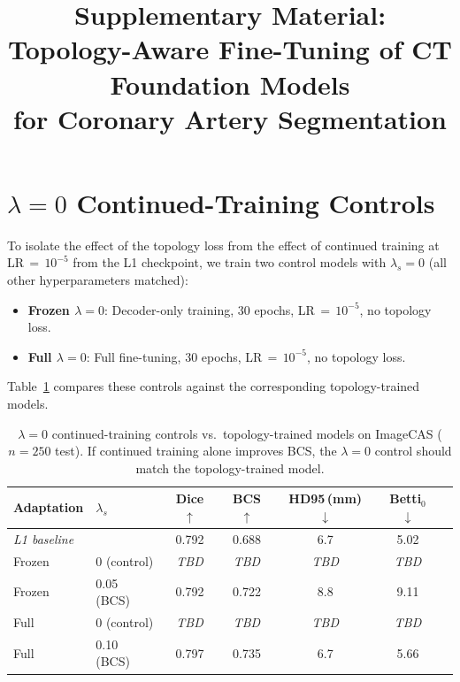 \documentclass[runningheads]{llncs}
\begin{document}
\title{Supplementary Material:\\Topology-Aware Fine-Tuning of CT Foundation Models\\for Coronary Artery Segmentation}
\maketitle


\section{$\lambda{=}0$ Continued-Training Controls}
\label{sec:lambda0}

To isolate the effect of the topology loss from the effect of continued training at LR$\,{=}\,10^{-5}$ from the L1 checkpoint, we train two control models with $\lambda_s{=}0$ (all other hyperparameters matched):

\begin{itemize}
\item \textbf{Frozen $\lambda{=}0$}: Decoder-only training, 30 epochs, LR$\,{=}\,10^{-5}$, no topology loss.
\item \textbf{Full $\lambda{=}0$}: Full fine-tuning, 30 epochs, LR$\,{=}\,10^{-5}$, no topology loss.
\end{itemize}

Table~\ref{tab:lambda0} compares these controls against the corresponding topology-trained models.

\begin{table}[h]
\caption{$\lambda{=}0$ continued-training controls vs.\ topology-trained models on ImageCAS ($n{=}250$ test). If continued training alone improves BCS, the $\lambda{=}0$ control should match the topology-trained model.}
\label{tab:lambda0}
\centering
\small
\begin{tabular}{llccccc}
\toprule
Adaptation & $\lambda_s$ & Dice $\uparrow$ & BCS $\uparrow$ & HD95\,(mm) $\downarrow$ & Betti$_0$ $\downarrow$ \\
\midrule
\multicolumn{2}{l}{\textit{L1 baseline}} & 0.792 & 0.688 & 6.7 & 5.02 \\
\midrule
Frozen & 0 (control)  & \textit{TBD} & \textit{TBD} & \textit{TBD} & \textit{TBD} \\
Frozen & 0.05 (BCS)   & 0.792 & 0.722 & 8.8 & 9.11 \\
\midrule
Full   & 0 (control)  & \textit{TBD} & \textit{TBD} & \textit{TBD} & \textit{TBD} \\
Full   & 0.10 (BCS)   & 0.797 & 0.735 & 6.7 & 5.66 \\
\bottomrule
\end{tabular}
\end{table}
\end{document}
